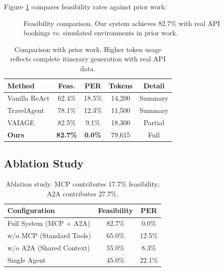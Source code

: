 \documentclass[conference]{IEEEtran}
\begin{document}
Figure \ref{fig:feasibility} compares feasibility rates against prior work:

\begin{figure}[htbp]
    \centering
    \caption{Feasibility comparison. Our system achieves 82.7\% with real API bookings vs. simulated environments in prior work.}
    \label{fig:feasibility}
\end{figure}

\begin{table}[h]
\centering
\small
\begin{tabular}{lcccc}
\toprule
\textbf{Method} & \textbf{Feas.} & \textbf{PER} & \textbf{Tokens} & \textbf{Detail} \\
\midrule
Vanilla ReAct & 62.4\% & 18.5\% & 14,200 & Summary \\
TravelAgent & 78.1\% & 12.3\% & 11,500 & Summary \\
VAIAGE & 82.5\% & 9.1\% & 18,300 & Partial \\
\textbf{Ours} & \textbf{82.7\%} & \textbf{0.0\%} & 79,615 & Full \\
\bottomrule
\end{tabular}
\caption{Comparison with prior work. Higher token usage reflects complete itinerary generation with real API data.}
\label{tab:baseline}
\end{table}

\subsection{Ablation Study}

\begin{table}[h]
\centering
\begin{tabular}{lcc}
\toprule
\textbf{Configuration} & \textbf{Feasibility} & \textbf{PER} \\
\midrule
Full System (MCP + A2A) & 82.7\% & 0.0\% \\
w/o MCP (Standard Tools) & 65.0\% & 12.5\% \\
w/o A2A (Shared Context) & 55.0\% & 8.3\% \\
Single Agent & 45.0\% & 22.1\% \\
\bottomrule
\end{tabular}
\caption{Ablation study. MCP contributes 17.7\% feasibility; A2A contributes 27.7\%.}
\label{tab:ablation}
\end{table}
\end{document}
